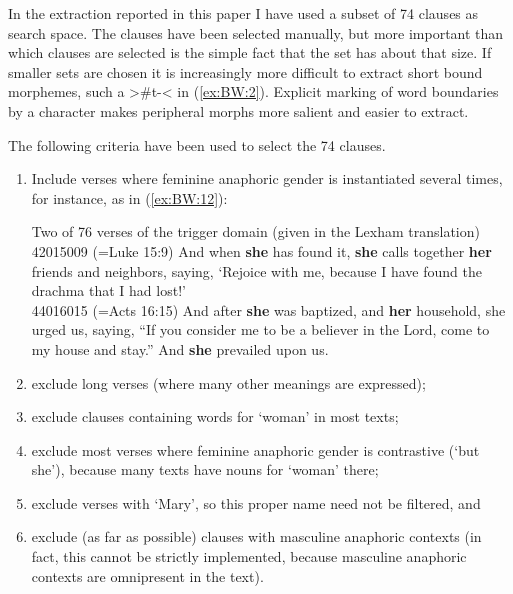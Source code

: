 \documentclass[output=collectionpaper]{langsci/langscibook}
\begin{document}
In the extraction reported in this paper I have used a subset of 74 clauses as search space. The clauses have been selected manually, but more important than which clauses are selected is the simple fact that the set has about that size. If smaller sets are chosen it is increasingly more difficult to extract short bound morphemes, such a  >\#t-< in (\ref{ex:BW:2}). Explicit marking of word boundaries by a character makes peripheral morphs more salient and easier to extract.

The following criteria have been used to select the 74 clauses.

\begin{enumerate}[label=(\roman*)]
  \item Include verses where feminine anaphoric gender is instantiated several times, for instance, as in (\ref{ex:BW:12}):

  \ea\label{ex:BW:12}
  Two of 76 verses of the trigger domain (given in the  Lexham translation)\\
42015009 (=Luke 15:9) And when \textbf{she} has found it, \textbf{she} calls together \textbf{her} friends and neighbors, saying, ‘Rejoice with me, because I have found the drachma that I had lost!’\\
44016015 (=Acts 16:15) And after \textbf{she} was baptized, and \textbf{her} household, she urged us, saying, “If you consider me to be a believer in the Lord, come to my house and stay.” And \textbf{she} prevailed upon us.
\z

  \item exclude long verses (where many other meanings are expressed);
  \item exclude clauses containing words for ‘woman’ in most texts;
  \item exclude most verses where feminine anaphoric gender is contrastive (‘but she’), because many texts have nouns for ‘woman’ there;
  \item exclude verses with ‘Mary’, so this proper name need not be filtered, and
  \item exclude (as far as possible) clauses with masculine anaphoric contexts (in fact, this cannot be strictly implemented, because masculine anaphoric contexts are omnipresent in the text).
\end{enumerate}
\end{document}
